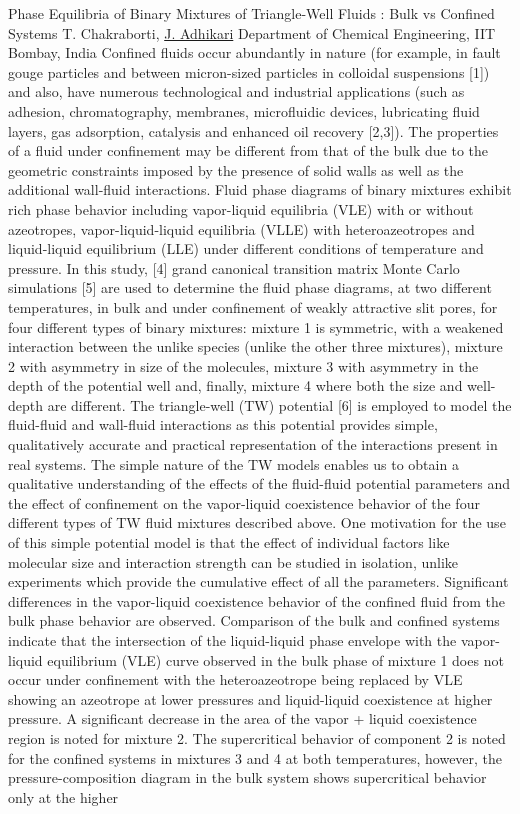 
    \begin{abstract_online}{Phase Equilibria of Binary Mixtures of Triangle-Well Fluids : Bulk vs Confined Systems}{%
        T. Chakraborti, \underline{J. Adhikari}}{%
        \IStag}{%
        Department of Chemical Engineering, IIT Bombay, India}
    Confined fluids occur abundantly in nature (for example, in fault gouge particles and between micron-sized particles in colloidal suspensions [1]) and also, have numerous technological and industrial applications (such as adhesion, chromatography, membranes, microfluidic devices, lubricating fluid layers, gas adsorption, catalysis and enhanced oil recovery [2,3]). The properties of a fluid under confinement may be different from that of the bulk due to the geometric constraints imposed by the presence of solid walls as well as the additional wall-fluid interactions. Fluid phase diagrams of binary mixtures exhibit rich phase behavior including vapor-liquid equilibria (VLE) with or without azeotropes, vapor-liquid-liquid equilibria (VLLE) with heteroazeotropes and liquid-liquid equilibrium (LLE) under different conditions of temperature and pressure. In this study, [4] grand canonical transition matrix Monte Carlo simulations [5] are used to determine the fluid phase diagrams, at two different temperatures, in bulk and under confinement of weakly attractive slit pores, for four different types of binary mixtures: mixture 1 is symmetric, with a weakened interaction between the unlike species (unlike the other three mixtures), mixture 2 with asymmetry in size of the molecules, mixture 3 with asymmetry in the depth of the potential well and, finally, mixture 4 where both the size and well-depth are different. The triangle-well (TW) potential [6] is employed to model the fluid-fluid and wall-fluid interactions as this potential provides simple, qualitatively accurate and practical representation of the interactions present in real systems. The simple nature of the TW models enables us to obtain a qualitative understanding of the effects of the fluid-fluid potential parameters and the effect of confinement on the vapor-liquid coexistence behavior of the four different types of TW fluid mixtures described above. One motivation for the use of this simple potential model is that the effect of individual factors like molecular size and interaction strength can be studied in isolation, unlike experiments which provide the cumulative effect of all the parameters. Significant differences in the vapor-liquid coexistence behavior of the confined fluid from the bulk phase behavior are observed. Comparison of the bulk and confined systems indicate that the intersection of the liquid-liquid phase envelope with the vapor-liquid equilibrium (VLE) curve observed in the bulk phase of mixture 1 does not occur under confinement with the heteroazeotrope being replaced by VLE showing an azeotrope at lower pressures and liquid-liquid coexistence at higher pressure. A significant decrease in the area of the vapor + liquid coexistence region is noted for mixture 2. The supercritical behavior of component 2 is noted for the confined systems in mixtures 3 and 4 at both temperatures, however, the pressure-composition diagram in the bulk system shows supercritical behavior only at the higher 
\end{abstract_online}
